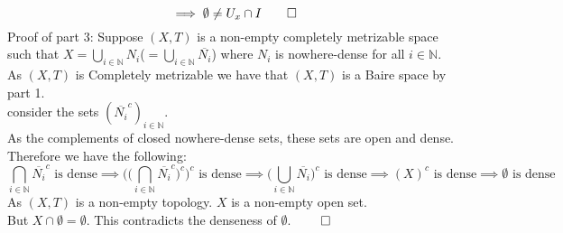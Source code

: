 \documentclass{report}
\begin{document}
$$\implies \emptyset \neq U_x\cap I \qed$$
Proof of part 3: Suppose $(X,T)$ is a non-empty completely metrizable space such that $X=\bigcup_{i\in \mathbb{N}} N_i$($=\bigcup_{i\in \mathbb{N}} \overline{N_i}$) where $N_i$ is nowhere-dense for all $i \in \mathbb{N}$.\\
As $(X,T)$ is Completely metrizable we have that $(X,T)$ is a Baire space by part 1.\\
consider the sets $(\overline{N_i}^c)_{i\in \mathbb{N}}$.\\
As the complements of closed nowhere-dense sets, these sets are open and dense.\\
Therefore we have the following:
\[\bigcap_{i \in \mathbb{N}} \overline{N_i}^c \text{  is dense}\implies \Big(\Big(\bigcap_{i \in \mathbb{N}} \overline{N_i}^c\Big)^c\Big)^c \text{  is dense}\implies \Big(\bigcup_{i \in \mathbb{N}} \overline{N_i}\Big)^c \text{  is dense}\implies (X)^c \text{  is dense}\implies \emptyset \text{  is dense}\]
As $(X,T)$ is a non-empty topology. $X$ is a non-empty open set.\\
But $X\cap \emptyset=\emptyset$. This contradicts the denseness of $\emptyset$. $\qed$
\end{document}
